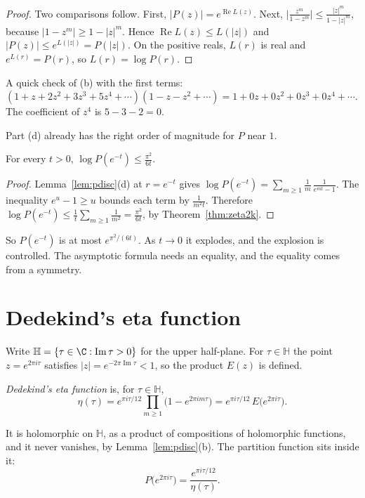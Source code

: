 \begin{proof}
Two comparisons follow. First, $|P(z)|=e^{\operatorname{Re}L(z)}$. Next, $\bigl|\frac{z^m}{1-z^m}\bigr|\le\frac{|z|^m}{1-|z|^m}$, because $|1-z^m|\ge1-|z|^m$. Hence $\operatorname{Re}L(z)\le L(|z|)$ and $|P(z)|\le e^{L(|z|)}=P(|z|)$. On the positive reals, $L(r)$ is real and $e^{L(r)}=P(r)$, so $L(r)=\log P(r)$.
\end{proof}

A quick check of (b) with the first terms: $(1+z+2z^2+3z^3+5z^4+\cdots)(1-z-z^2+\cdots)=1+0z+0z^2+0z^3+0z^4+\cdots$. The coefficient of $z^4$ is $5-3-2=0$.

Part (d) already has the right order of magnitude for $P$ near $1$.

\begin{lemma}\label{lem:plog}
For every $t>0$, $\log P(e^{-t})\le\frac{\pi^2}{6t}$.
\end{lemma}
\begin{proof}
Lemma~\ref{lem:pdisc}(d) at $r=e^{-t}$ gives $\log P(e^{-t})=\sum_{m\ge1}\frac1m\,\frac1{e^{mt}-1}$. The inequality $e^u-1\ge u$ bounds each term by $\frac1{m^2t}$. Therefore $\log P(e^{-t})\le\frac1t\sum_{m\ge1}\frac1{m^2}=\frac{\pi^2}{6t}$, by Theorem~\ref{thm:zeta2k}.
\end{proof}

So $P(e^{-t})$ is at most $e^{\pi^2/(6t)}$. As $t\to0$ it explodes, and the explosion is controlled. The asymptotic formula needs an equality, and the equality comes from a symmetry.

\section{Dedekind's eta function}

Write $\mathbb H=\{\tau\in\C:\operatorname{Im}\tau>0\}$ for the upper half-plane. For $\tau\in\mathbb H$ the point $z=e^{2\pi i\tau}$ satisfies $|z|=e^{-2\pi\operatorname{Im}\tau}<1$, so the product $E(z)$ is defined.

\begin{definition}
\emph{Dedekind's eta function} is, for $\tau\in\mathbb H$,
\[
\eta(\tau)=e^{\pi i\tau/12}\prod_{m\ge1}\bigl(1-e^{2\pi im\tau}\bigr)=e^{\pi i\tau/12}\,E\bigl(e^{2\pi i\tau}\bigr).
\]
\end{definition}

It is holomorphic on $\mathbb H$, as a product of compositions of holomorphic functions, and it never vanishes, by Lemma~\ref{lem:pdisc}(b). The partition function sits inside it:
\[
P\bigl(e^{2\pi i\tau}\bigr)=\frac{e^{\pi i\tau/12}}{\eta(\tau)}.
\]

